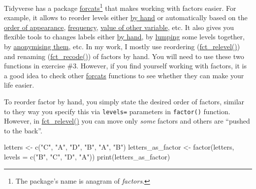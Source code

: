 \documentclass[
]{book}
\newenvironment{Shaded}{\begin{snugshade}}{\end{snugshade}}
\newcommand{\AttributeTok}[1]{\textcolor[rgb]{0.77,0.63,0.00}{#1}}
\newcommand{\FunctionTok}[1]{\textcolor[rgb]{0.00,0.00,0.00}{#1}}
\newcommand{\NormalTok}[1]{#1}
\newcommand{\OtherTok}[1]{\textcolor[rgb]{0.56,0.35,0.01}{#1}}
\newcommand{\StringTok}[1]{\textcolor[rgb]{0.31,0.60,0.02}{#1}}
\begin{document}
Tidyverse has a package \href{https://forcats.tidyverse.org/}{forcats}\footnote{The package's name is anagram of \emph{factors}.} that makes working with factors easier. For example, it allows to reorder levels either \href{https://forcats.tidyverse.org/reference/fct_relevel.html}{by hand} or automatically based on the \href{https://forcats.tidyverse.org/reference/fct_inorder.html}{order of appearance}, \href{https://forcats.tidyverse.org/reference/fct_inorder.html}{frequency}, \href{https://forcats.tidyverse.org/reference/fct_reorder.html}{value of other variable}, etc. It also gives you flexible tools to changes labels either \href{https://forcats.tidyverse.org/reference/fct_recode.html}{by hand}, by \href{https://forcats.tidyverse.org/reference/fct_lump.html}{lumping} some levels together, by \href{https://forcats.tidyverse.org/reference/fct_anon.html}{anonymising them}, etc. In my work, I mostly use reordering (\href{https://forcats.tidyverse.org/reference/fct_relevel.html}{fct\_relevel()}) and renaming (\href{https://forcats.tidyverse.org/reference/fct_recode.html}{fct\_recode()}) of factors by hand. You will need to use these two functions in exercise \#3. However, if you find yourself working with factors, it is a good idea to check other \href{https://forcats.tidyverse.org/}{forcats} functions to see whether they can make your life easier.

To reorder factor by hand, you simply state the desired order of factors, similar to they way you specify this via \texttt{levels=} parameters in \texttt{factor()} function. However, in \href{https://forcats.tidyverse.org/reference/fct_relevel.html}{fct\_relevel()} you can move only \emph{some} factors and others are ``pushed to the back''.

\begin{Shaded}
\begin{Highlighting}[]
\NormalTok{letters }\OtherTok{\textless{}{-}} \FunctionTok{c}\NormalTok{(}\StringTok{"C"}\NormalTok{, }\StringTok{"A"}\NormalTok{, }\StringTok{"D"}\NormalTok{, }\StringTok{"B"}\NormalTok{, }\StringTok{"A"}\NormalTok{, }\StringTok{"B"}\NormalTok{)}
\NormalTok{letters\_as\_factor }\OtherTok{\textless{}{-}} \FunctionTok{factor}\NormalTok{(letters, }\AttributeTok{levels =} \FunctionTok{c}\NormalTok{(}\StringTok{"B"}\NormalTok{, }\StringTok{"C"}\NormalTok{, }\StringTok{"D"}\NormalTok{, }\StringTok{"A"}\NormalTok{))}
\FunctionTok{print}\NormalTok{(letters\_as\_factor)}
\end{Highlighting}
\end{Shaded}
\end{document}
